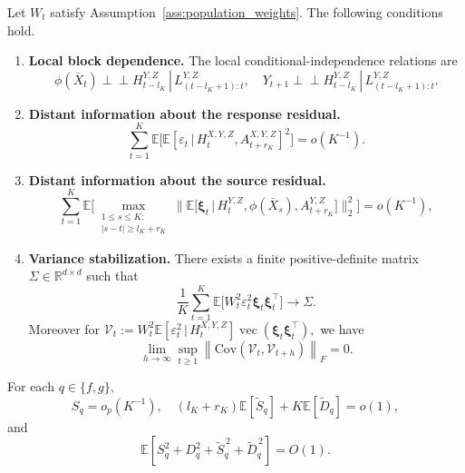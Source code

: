 \documentclass[10pt,a4paper]{amsart}
\def\E{\mathbb{E}}
\newcommand\given{\,|\,}
\newcommand{\Cov}{\mathrm{Cov}}
\newcommand{\indep}{\perp \!\!\! \perp}
\begin{document}
\begin{assumption}
\label{ass:mixing}
Let \(W_t\) satisfy Assumption~\ref{ass:population_weights}.
The following conditions hold.
\begin{enumerate}
\item[(i)] \textbf{Local block dependence.}
The local conditional-independence relations are
\[
\phi(\bar X_t)\indep H^{Y,Z}_{t-l_K}
\given L^{Y,Z}_{(t-l_K+1):t},\quad
Y_{t+1}\indep H^{Y,Z}_{t-l_K}
\given L^{Y,Z}_{(t-l_K+1):t}.
\]
\item[(ii)] \textbf{Distant information about the response residual.}
\begin{equation}
\label{eq:epsilon-mixing}
\sum_{t=1}^K
\E\big[
\E[\varepsilon_t\given H_t^{X,Y,Z},A_{t+r_K}^{X,Y,Z}]^2
\big]=o(K^{-1}).
\end{equation}

\item[(iii)] \textbf{Distant information about the source residual.}
\begin{equation}
\label{eq:xi-mixing}
\sum_{t=1}^K
\E\Big[
\max_{\substack{1\le s\le K:\\|s-t|\ge l_K+r_K}}
\big\|
\E\big[\boldsymbol\xi_t\given
H_t^{Y,Z},\phi(\bar X_s),A_{t+r_K}^{Y,Z}\big]
\big\|_2^2
\Big]=o(K^{-1}),
\end{equation}

\item[(iv)] \textbf{Variance stabilization.}
There exists a finite positive-definite matrix
\(\Sigma\in\mathbb R^{d\times d}\) such that
\begin{equation}
\label{eq:oracle-unconditional-covariance-limit}
\frac1K\sum_{t=1}^K
\E\big[W_t^2\varepsilon_t^2
\boldsymbol\xi_t\boldsymbol\xi_t^\top\big]
\longrightarrow\Sigma.
\end{equation}
\sloppy
Moreover for $\mathcal V_t
:=
W_t^2\E[\varepsilon_t^2\given H_t^{X, Y,Z}]
\operatorname{vec}(\boldsymbol\xi_t\boldsymbol\xi_t^\top),$ we have
\begin{equation}
\label{eq:2-mixing}
    \lim_{h\to\infty}
\sup_{t \geq 1}
{\left\|
\Cov(\mathcal V_t,\mathcal V_{t+h})
\right\|_F}
=0 .
\end{equation}
\end{enumerate}
\end{assumption}

\begin{assumption}
\label{ass:stability}
For each \(q\in\{f,g\}\),
\begin{equation}
\label{eq:stability}
S_q=o_p(K^{-1}),\quad
(l_K+r_K)\E[\tilde S_q]+K\E[\tilde D_q]=o(1),
\end{equation}
and
\begin{equation}
\label{eq:stability-moments}
\E[S_q^2+D_q^2+\tilde S_q^{\,2}+\tilde D_q^{\,2}]
=O(1).
\end{equation}
\end{assumption}
\end{document}
